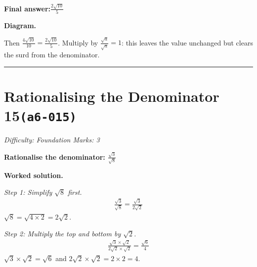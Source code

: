 \documentclass[11pt]{article}
\newcommand{\question}[1]{\par\medskip\noindent\textbf{#1}\par}
\begin{document}
\begin{answerbox}
\textbf{Final answer:}\quad \(\displaystyle \frac{2\sqrt{10}}{5}\)
\end{answerbox}
\textbf{Diagram.}

\begin{center}
\end{center}
\small Then $\frac{4\sqrt{10}}{10}=\frac{2\sqrt{10}}{5}$. Multiply by $\frac{\sqrt{a}}{\sqrt{a}}=1$: this leaves the value unchanged but clears the surd from the denominator.\normalsize

\medskip\hrule

\section*{Rationalising the Denominator 15\quad\small\texttt{(a6-015)}}
\textit{Difficulty: Foundation \quad\textbar\quad Marks: 3}

\question{Rationalise the denominator: \( \frac{\sqrt{3}}{\sqrt{8}} \)}

\textbf{Worked solution.}

\textit{Step 1: Simplify \( \sqrt{8} \) first.}
\[\begin{gathered}
\frac{\sqrt{3}}{\sqrt{8}} = \frac{\sqrt{3}}{2\sqrt{2}}
\end{gathered}\]
\( \sqrt{8} = \sqrt{4 \times 2} = 2\sqrt{2} \).

\textit{Step 2: Multiply the top and bottom by \( \sqrt{2} \).}
\[\begin{gathered}
\frac{\sqrt{3} \times \sqrt{2}}{2\sqrt{2} \times \sqrt{2}} = \frac{\sqrt{6}}{4}
\end{gathered}\]
\( \sqrt{3} \times \sqrt{2} = \sqrt{6} \) and \( 2\sqrt{2} \times \sqrt{2} = 2 \times 2 = 4 \).
\end{document}
